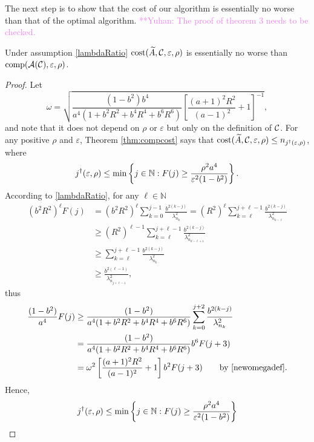 \documentclass[graybox,footinfo]{svmult}
\newcommand{\yuhannote}[1]{ {\textcolor{violet}  {\mbox{**Yuhan:} #1}}}
\begin{document}
The next step is to show that the cost of our algorithm is essentially no worse than that of the optimal algorithm.
\yuhannote{The proof of theorem 3 needs to be checked.}
\begin{theorem}
\label{thm:CostNoWorse}
Under assumption \eqref{lambdaRatio} $\textup{cost}(\widetilde{A},{\mathcal{C}}, \varepsilon,\rho)$ is essentially no worse than $\textup{comp}({\mathcal{A}}({\mathcal{C}}),\varepsilon,\rho)$. 
\end{theorem}
\begin{proof} Let
\begin{equation} \label{newomegadef}
    \omega = \sqrt{\frac{(1 - b^2)b^4}{a^4(1 + b^2R^2 + b^4R^4 + b^6R^6)}\left[\frac{(a+1)^{2} R^2 }{(a-1)^2} + 1\right]^{-1}},
\end{equation}
and note that it does not depend on $\rho$ or $\varepsilon$ but only on the definition of ${\mathcal{C}}$. 
For any positive $\rho$ and $\varepsilon$, Theorem \ref{thm:compcost} says that $\textup{cost}(\widetilde{A},{\mathcal{C}},\varepsilon,\rho) \le n_{j^\dagger(\varepsilon,\rho)}$, where 
\[
j^\dagger(\varepsilon,\rho) \le \min \left \{j \in {\mathbb{N}} : F(j) \ge \frac{\rho^2 a^4}{\varepsilon^2 (1-b^2)}  \right\}. \]
According to \eqref{lambdaRatio}, for any $\ell \in \mathbb{N}$
\begin{align*}
 (b^2R^2)^\ell F(j)
& =(b^2R^2)^\ell \sum_{k=0}^{j-1} \frac{b^{2(k-j)}}{\lambda_{n_{k}}^2} 
 = (R^2)^\ell\sum_{k=\ell}^{j+\ell-1} \frac{b^{2(k-j)}}{\lambda_{n_{k-\ell}}^2} \\
& \geq (R^2)^{\ell-1}\sum_{k=\ell}^{j+\ell-1} \frac{b^{2(k-j)}}{\lambda_{n_{k-\ell+1}}^2} \\
 & \geq \sum_{k=\ell}^{j+\ell-1} \frac{b^{2(k-j)}}{\lambda_{n_{k}}^2} \\
& \geq \frac{b^{2(\ell-1)}}{\lambda_{n_{j+\ell-1}}^2},
\end{align*}
thus 
\begin{align*} 
  \frac{(1 - b^2)}{a^4} F(j) 
&\ge  \frac{(1 - b^2)}{a^4(1 + b^2R^2 + b^4R^4 + b^6R^6)} \sum_{k=0}^{j+2} \frac{b^{2(k-j)}}{\lambda_{n_{k}}^2}  \\
& = \frac{(1 - b^2)}{a^4(1 + b^2R^2 + b^4R^4 + b^6R^6)} b^6 F(j+3)\\
&=  \omega^2\left[\frac{(a+1)^{2} R^2 }{(a-1)^2} + 1\right] b^2 F(j+3) \qquad \text{by \eqref{newomegadef}.}
\end{align*}
Hence,
\begin{align*} 
j^\dagger(\varepsilon,\rho) &\le \min \left \{j \in \bbN : F(j) \ge \frac{\rho^2 a^4}{\varepsilon^2 (1-b^2)}   \right\} \\

\end{align*}
\end{proof}
\end{document}
